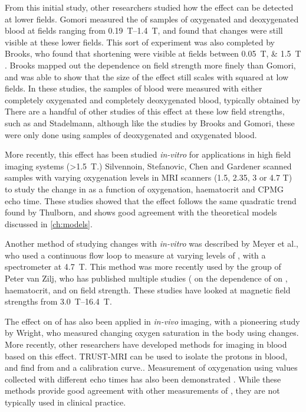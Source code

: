 From this initial study, other researchers studied how the effect can be detected at lower fields.
Gomori measured the \Ttwo of samples of oxygenated and deoxygenated blood at fields ranging from \SIrange{0.19}{1.4}{T}, and found that changes were still visible at these lower fields\cite{GomoriNMRRelaxationTimes1987}.
This sort of experiment was also completed by Brooks, who found that \Ttwo shortening were visible at fields between \SIlist{0.05;1.5}{T} \cite{BrooksComparisont2relaxation1995}.
Brooks mapped out the dependence on field strength more finely than Gomori, and was able to show that the size of the effect still scales with \Bzero squared at low fields.
In these studies, the samples of blood were measured with either completely oxygenated and completely deoxygenated blood, typically obtained by
There are a handful of other studies of this effect at these low field strengths, such as \cite{BryantMagneticrelaxationblood1990} and Stadelmann\cite{StadelmannRelaxationtimesvenous1991},
although like the studies by Brooks and Gomori, these were only done using samples of deoxygenated and oxygenated blood.

More recently, this effect has been studied \textit{in-vitro} for applications in high field imaging systems (\SI{>1.5}{T}.)
Silvennoin\cite{JohannaSilvennoinenBloodNMRrelaxation2002}, Stefanovic\cite{StefanovicHumanwholebloodrelaxometry2004}, Chen\cite{ChenHumanwholeblood2009} and Gardener\cite{GardenerDependencebloodR22010} scanned samples with varying oxygenation levels in MRI scanners (1.5, 2.35, 3 or 4.7 T) to study the change in \Ttwo as a function of oxygenation, haematocrit and CPMG echo time.
These studies showed that the effect follows the same quadratic trend found by Thulborn, and shows good agreement with the theoretical models discussed in \autoref{ch:models}.

Another method of studying \Ttwo changes with \SOtwo \textit{in-vitro} was described by Meyer et al., who used a continuous flow loop to measure \Ttwo at varying levels of \SOtwo, with a spectrometer at \SI{4.7}{T}.
This method was more recently used by the group of Peter van Zilj, who has published multiple studies (\cite{ZhaoOxygenationhematocritdependence2007,GrgacTransversewaterrelaxation2017,QinDeterminationwholebrainoxygen2011} on the dependence of \Ttwo on \SOtwo, haematocrit, and on field strength.
These studies have looked at magnetic field strengths from \SIrange{3.0}{16.4}{T}.

The effect on \Ttwo of \SOtwo has also been applied in \textit{in-vivo} imaging, with a pioneering study by Wright\cite{WrightEstimatingoxygensaturation1991}, who measured changing oxygen saturation in the body using \Ttwo changes.
More recently, other researchers have developed methods for imaging \SOtwo in blood based on this \Ttwo effect\cite{RodgersMRIbasedmethodsquantification2016}.
TRUST-MRI can be used to isolate the protons in blood, and find \SOtwo from \Ttwo and a calibration curve.\cite{LuQuantitativeevaluationoxygenation2008}.
Measurement of oxygenation using \Ttwo values collected with different echo times has also been demonstrated \cite{VargheseCMRbasedbloodoximetry2017}.
While these methods provide good agreement with other measurements of \SOtwo, they are not typically used in clinical practice.

